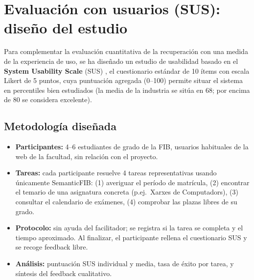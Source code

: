 \documentclass[12pt, a4paper, twoside]{report}
\begin{document}
\section{Evaluaci\'on con usuarios (SUS): dise\~no del estudio}
\label{sec:sus}


Para complementar la evaluaci\'on cuantitativa de la recuperaci\'on con una medida de la experiencia de uso, se ha dise\~nado un estudio de usabilidad basado en el \textbf{System Usability Scale} (SUS) \cite{brooke1996}, el cuestionario est\'andar de 10 \'items con escala Likert de 5 puntos, cuya puntuaci\'on agregada (0--100) permite situar el sistema en percentiles bien estudiados (la media de la industria se sit\'ua en 68; por encima de 80 se considera excelente).

\subsection{Metodolog\'ia dise\~nada}

\begin{itemize}
  \item \textbf{Participantes:} 4--6 estudiantes de grado de la FIB, usuarios habituales de la web de la facultad, sin relaci\'on con el proyecto.
  \item \textbf{Tareas:} cada participante resuelve 4 tareas representativas usando \'unicamente SemanticFIB: (1) averiguar el per\'iodo de matr\'icula, (2) encontrar el temario de una asignatura concreta (p.ej.\ Xarxes de Computadors), (3) consultar el calendario de ex\'amenes, (4) comprobar las plazas libres de su grado.
  \item \textbf{Protocolo:} sin ayuda del facilitador; se registra si la tarea se completa y el tiempo aproximado. Al finalizar, el participante rellena el cuestionario SUS y se recoge feedback libre.
  \item \textbf{An\'alisis:} puntuaci\'on SUS individual y media, tasa de \'exito por tarea, y s\'intesis del feedback cualitativo.
\end{itemize}
\end{document}
